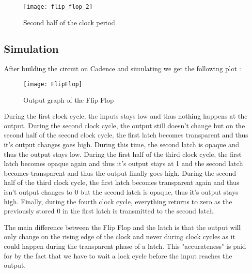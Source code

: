 \documentclass{article}
\begin{document}
\begin{figure}[H]
\centerline{\texttt{[image: flip\_flop\_2]}}
\caption{Second half of the clock period}
\end{figure}

\subsection{Simulation}

After building the circuit on Cadence and simulating we get the following plot :

\begin{figure}[H]
\centerline{\texttt{[image: FlipFlop]}}
\caption{Output graph of the Flip Flop}
\end{figure}
During the first clock cycle, the inputs stays low and thus nothing happens at the output. During the second clock cycle, the output still doesn't change but on the second half of the second clock cycle, the first latch becomes transparent and thus it's output changes goes high. During this time, the second latch is opaque and thus the output stays low. During the first half of the third clock cycle, the first latch becomes opaque again and thus it's output stays at 1 and the second latch becomes transparent and thus the output finally goes high. During the second half of the third clock cycle, the first latch becomes transparent again and thus isn't output changes to 0 but the second latch is opaque, thus it's output stays high. Finally, during the fourth clock cycle, everything returns to zero as the previously stored 0 in the first latch is transmitted to the second latch.

The main difference between the Flip Flop and the latch is that the output will only change on the rising edge of the clock and never during clock cycles as it could happen during the transparent phase of a latch. This "accurateness" is paid for by the fact that we have to wait a lock cycle before the input reaches the output.
\end{document}
